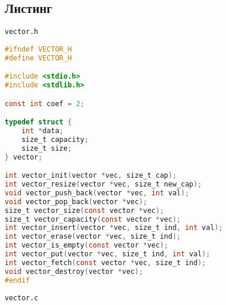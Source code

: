 \documentclass[12pt]{article}
\begin{document}
\subsection*{Листинг}
\verb|vector.h|
\begin{lstlisting}[language=C, basicstyle=\scriptsize]
#ifndef VECTOR_H
#define VECTOR_H

#include <stdio.h>
#include <stdlib.h>

const int coef = 2;

typedef struct {
    int *data;
    size_t capacity;
    size_t size;
} vector;

int vector_init(vector *vec, size_t cap);
int vector_resize(vector *vec, size_t new_cap);
void vector_push_back(vector *vec, int val);
void vector_pop_back(vector *vec);
size_t vector_size(const vector *vec);
size_t vector_capacity(const vector *vec);
int vector_insert(vector *vec, size_t ind, int val);
int vector_erase(vector *vec, size_t ind);
int vector_is_empty(const vector *vec);
int vector_put(vector *vec, size_t ind, int val);
int vector_fetch(const vector *vec, size_t ind);
void vector_destroy(vector *vec);
#endif
\end{lstlisting}
\verb|vector.c|
\end{document}
